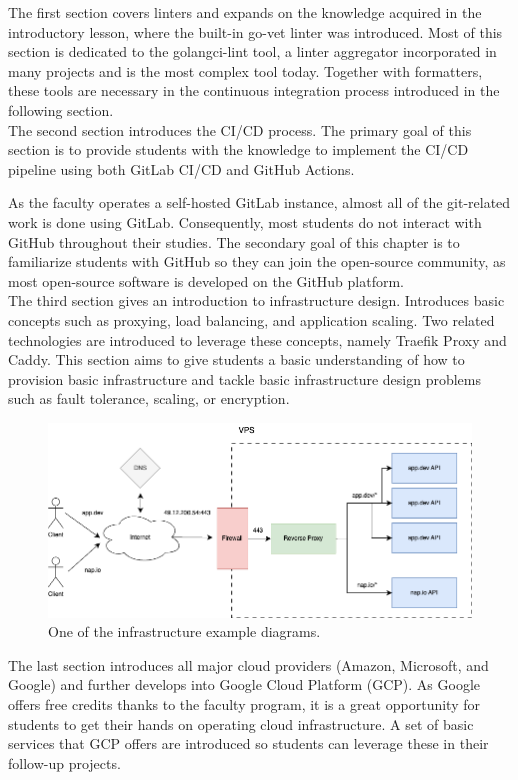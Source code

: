 \documentclass[
  digital,
  color,
  oneside,
  nosansbold,
  nocolorbold,
  lof,
  lot,
]{fithesis4}
\begin{document}
The first section covers linters and expands on the knowledge acquired in the introductory lesson, where the built-in go-vet linter was introduced. Most of this section is dedicated to the golangci-lint tool, a linter aggregator incorporated in many projects and is the most complex tool today. Together with formatters, these tools are necessary in the continuous integration process introduced in the following section. \\

The second section introduces the CI/CD process. The primary goal of this section is to provide students with the knowledge to implement the CI/CD pipeline using both GitLab CI/CD and GitHub Actions.

As the faculty operates a self-hosted GitLab instance, almost all of the git-related work is done using GitLab. Consequently, most students do not interact with GitHub throughout their studies. The secondary goal of this chapter is to familiarize students with GitHub so they can join the open-source community, as most open-source software is developed on the GitHub platform. \\

The third section gives an introduction to infrastructure design. Introduces basic concepts such as proxying, load balancing, and application scaling. Two related technologies are introduced to leverage these concepts, namely Traefik Proxy and Caddy. This section aims to give students a basic understanding of how to provision basic infrastructure and tackle basic infrastructure design problems such as fault tolerance, scaling, or encryption.

\begin{figure}[H]
    \centering
    \includegraphics[width=12cm]{figures/infrastructure.png}
    \caption{One of the infrastructure example diagrams.}
\end{figure}

The last section introduces all major cloud providers (Amazon, Microsoft, and Google) and further develops into Google Cloud Platform (GCP). As Google offers free credits thanks to the faculty program, it is a great opportunity for students to get their hands on operating cloud infrastructure. A set of basic services that GCP offers are introduced so students can leverage these in their follow-up projects.
\end{document}
